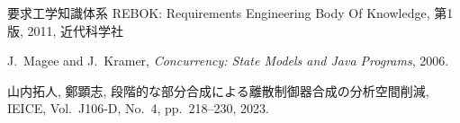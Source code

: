 \documentclass[11pt]{jarticle}
\begin{document}

\begin{thebibliography}{99} %
{\footnotesize

要求工学知識体系 REBOK: Requirements Engineering Body Of Knowledge, 第1版, 2011, 近代科学社

J.~Magee and J.~Kramer, 
{\it Concurrency: State Models and Java Programs}, 2006.

山内拓人, 鄭顕志, 段階的な部分合成による離散制御器合成の分析空間削減, 
IEICE, Vol.~J106-D, No.~4, pp.~218--230, 2023.

}
\end{thebibliography} %

\end{document}
